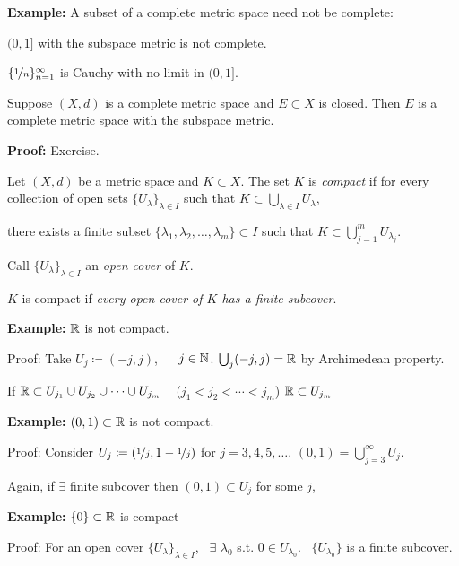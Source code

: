 \documentclass[10pt,aspectratio=169]{beamer}
\begin{document}
\begin{frame}

\textbf{Example:}
A subset of a complete metric space need not be complete:

\pause
$(0,1]$ with the subspace metric is not complete.

\pause
$\{ \nicefrac{1}{n} \}_{n=1}^\infty$ is Cauchy
with no limit in $(0,1]$.

\pause
\begin{proposition}
Suppose $(X,d)$ is a complete metric space and $E \subset X$
is closed.
\pause
Then $E$ is a complete metric space with the subspace metric.
\end{proposition}

\pause
\textbf{Proof:} Exercise.

\end{frame}

\begin{frame}

\begin{definition}
Let $(X,d)$ be a metric space and $K \subset X$. 
\pause
The set $K$ is \emph{compact}
if for every collection
of open sets $\{ U_{\lambda} \}_{\lambda \in I}$ such that
\quad
$\displaystyle
K \subset \bigcup_{\lambda \in I} U_\lambda$,

\pause
there exists a finite subset
$\{ \lambda_1, \lambda_2,\ldots,\lambda_m \} \subset I$
such that
\quad
$\displaystyle
K \subset \bigcup_{j=1}^m U_{\lambda_j}$.
\end{definition}

\pause
Call $\{ U_{\lambda} \}_{\lambda \in I}$ an \emph{open cover} of $K$.


\pause
$K$ is compact if \emph{every open cover of $K$ has a finite subcover}.

\pause
\medskip

\textbf{Example:}
${\mathbb{R}}$ is not compact.

\pause
Proof: Take $U_j \coloneqq (-j,j)$, ~~ $j \in {\mathbb{N}}$.
\pause
\quad
$\bigcup_j (-j,j) = {\mathbb{R}}$ by Archimedean property.

\pause
If ${\mathbb{R}} \subset U_{j_1} \cup U_{j_2} \cup \cdots \cup U_{j_m}$ ~
($j_1 < j_2 < \cdots < j_m$) \wthus ${\mathbb{R}} \subset U_{j_m}$
\pause
\quad
\contradiction

\pause
\medskip

\textbf{Example:}
$(0,1) \subset {\mathbb{R}}$ is not compact.

\pause
Proof:  Consider $U_{j} \coloneqq (\nicefrac{1}{j},1-\nicefrac{1}{j})$ for $j=3,4,5,\ldots$.
\pause
\quad
$(0,1) = \bigcup_{j=3}^\infty U_j$.

\pause
Again, if $\exists$ finite subcover then $(0,1) \subset U_j$ for some
$j$,
\pause
\qquad \contradiction

\pause
\medskip

\textbf{Example:}
$\{ 0 \} \subset {\mathbb{R}}$ is compact

\pause
Proof: For an open cover $\{ U_{\lambda} \}_{\lambda \in I}$,
\pause
~$\exists$ $\lambda_0$ s.t. $0 \in U_{\lambda_0}$.
\pause
~$\{ U_{\lambda_0} \}$ is a finite subcover.

\end{frame}
\end{document}
